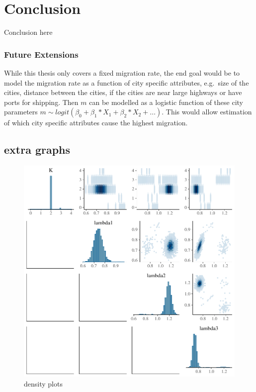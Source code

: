\documentclass[11pt,a4paper]{article}
\numberwithin{equation}{section}
\begin{document}
\pagebreak

\hypertarget{conclusion}{%
\section{Conclusion}\label{conclusion}}

Conclusion here

\hypertarget{future-extensions}{%
\subsubsection{Future Extensions}\label{future-extensions}}

While this thesis only covers a fixed migration rate, the end goal would
be to model the migration rate as a function of city specific
attributes, e.g.~size of the cities, distance between the cities, if the
cities are near large highways or have ports for shipping. Then \(m\)
can be modelled as a logistic function of these city parameters
\(m \sim logit(\beta_0 + \beta_1*X_1 + \beta_2*X_2 + \dots)\). This
would allow estimation of which city specific attributes cause the
highest migration.

\pagebreak

\hypertarget{extra-graphs}{%
\subsection{extra graphs}\label{extra-graphs}}

\begin{figure}
\centering
\includegraphics{thesis_draft_files/figure-latex/unnamed-chunk-13-1.pdf}
\caption{\label{fig:pairs_lambda} density plots}
\end{figure}
\end{document}
